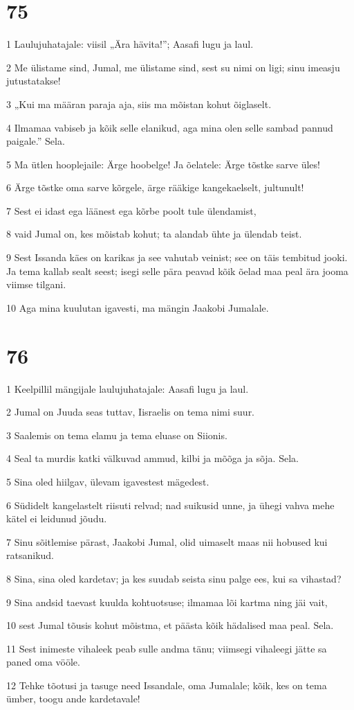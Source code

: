 \chapter{75}

\par 1 Laulujuhatajale: viisil „Ära hävita!”; Aasafi lugu ja laul.
\par 2 Me ülistame sind, Jumal, me ülistame sind, sest su nimi on ligi; sinu imeasju jutustatakse!
\par 3 „Kui ma määran paraja aja, siis ma mõistan kohut õiglaselt.
\par 4 Ilmamaa vabiseb ja kõik selle elanikud, aga mina olen selle sambad pannud paigale.” Sela.
\par 5 Ma ütlen hooplejaile: Ärge hoobelge! Ja õelatele: Ärge tõstke sarve üles!
\par 6 Ärge tõstke oma sarve kõrgele, ärge rääkige kangekaelselt, jultunult!
\par 7 Sest ei idast ega läänest ega kõrbe poolt tule ülendamist,
\par 8 vaid Jumal on, kes mõistab kohut; ta alandab ühte ja ülendab teist.
\par 9 Sest Issanda käes on karikas ja see vahutab veinist; see on täis tembitud jooki. Ja tema kallab sealt seest; isegi selle pära peavad kõik õelad maa peal ära jooma viimse tilgani.
\par 10 Aga mina kuulutan igavesti, ma mängin Jaakobi Jumalale.

\chapter{76}

\par 1 Keelpillil mängijale laulujuhatajale: Aasafi lugu ja laul.
\par 2 Jumal on Juuda seas tuttav, Iisraelis on tema nimi suur.
\par 3 Saalemis on tema elamu ja tema eluase on Siionis.
\par 4 Seal ta murdis katki välkuvad ammud, kilbi ja mõõga ja sõja. Sela.
\par 5 Sina oled hiilgav, ülevam igavestest mägedest.
\par 6 Südidelt kangelastelt riisuti relvad; nad suikusid unne, ja ühegi vahva mehe kätel ei leidunud jõudu.
\par 7 Sinu sõitlemise pärast, Jaakobi Jumal, olid uimaselt maas nii hobused kui ratsanikud.
\par 8 Sina, sina oled kardetav; ja kes suudab seista sinu palge ees, kui sa vihastad?
\par 9 Sina andsid taevast kuulda kohtuotsuse; ilmamaa lõi kartma ning jäi vait,
\par 10 sest Jumal tõusis kohut mõistma, et päästa kõik hädalised maa peal. Sela.
\par 11 Sest inimeste vihaleek peab sulle andma tänu; viimsegi vihaleegi jätte sa paned oma vööle.
\par 12 Tehke tõotusi ja tasuge need Issandale, oma Jumalale; kõik, kes on tema ümber, toogu ande kardetavale!

